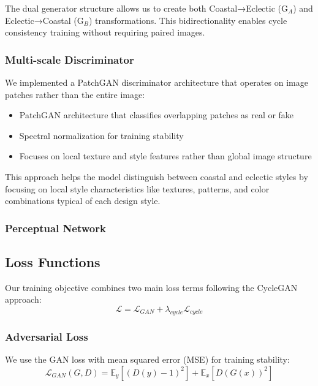 \documentclass[twocolumn,superscriptaddress,aps]{revtex4-1}
\begin{document}
The dual generator structure allows us to create both Coastal→Eclectic (G$_A$) and Eclectic→Coastal (G$_B$) transformations. This bidirectionality enables cycle consistency training without requiring paired images.

\subsubsection{Multi-scale Discriminator}

We implemented a PatchGAN discriminator architecture that operates on image patches rather than the entire image:

\begin{itemize}
    \item PatchGAN architecture that classifies overlapping patches as real or fake
    \item Spectral \cite{miyato2018spectral} normalization for training stability
    \item Focuses on local texture and style features rather than global image structure
\end{itemize}

This approach helps the model distinguish between coastal and eclectic styles by focusing on local style characteristics like textures, patterns, and color combinations typical of each design style.

\subsubsection{Perceptual Network}


\subsection{Loss Functions}
Our training objective combines two main loss terms following the CycleGAN approach:
\begin{equation}
\mathcal{L} = \mathcal{L}_{GAN} + \lambda_{cycle}\mathcal{L}_{cycle}
\end{equation}

\subsubsection{Adversarial Loss}
We use the GAN loss with mean squared error (MSE) for training stability:
\begin{equation}
\mathcal{L}_{GAN}(G, D) = \mathbb{E}_{y}[(D(y) - 1)^2] + \mathbb{E}_{x}[D(G(x))^2]
\end{equation}
\end{document}
